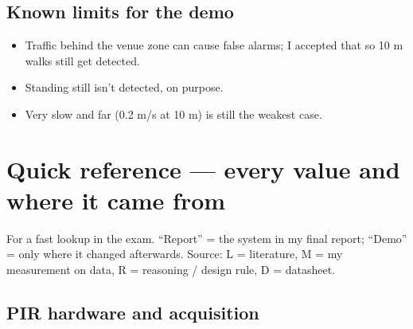 \documentclass[11pt,a4paper]{article}
\providecommand{\tightlist}{\setlength{\itemsep}{0pt}\setlength{\parskip}{0pt}}
\begin{document}
\hypertarget{known-limits-for-the-demo}{%
\subsection{Known limits for
the
demo}\label{known-limits-for-the-demo}}

\begin{itemize}
\tightlist
\item
  Traffic behind the venue
  zone can cause false alarms;
  I accepted that so 10 m
  walks still get detected.
\item
  Standing still isn't
  detected, on purpose.
\item
  Very slow and far (0.2 m/s
  at 10 m) is still the
  weakest case.
\end{itemize}

\hypertarget{quick-reference-every-value-and-where-it-came-from}{%
\section{Quick reference ---
every value and where it came
from}\label{quick-reference-every-value-and-where-it-came-from}}

For a fast lookup in the exam.
``Report'' = the system in my
final report; ``Demo'' = only
where it changed afterwards.
Source: L = literature, M = my
measurement on data, R =
reasoning / design rule, D =
datasheet.

\hypertarget{pir-hardware-and-acquisition}{%
\subsection{PIR hardware and
acquisition}\label{pir-hardware-and-acquisition}}
\end{document}
